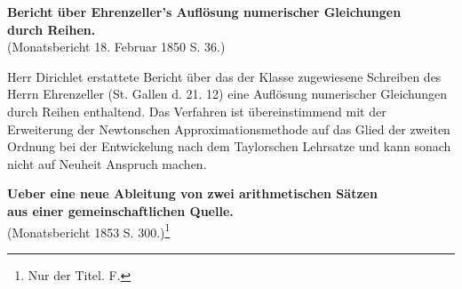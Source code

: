 \documentclass[11pt]{article}
\begin{document}
\bigskip
\begin{center}
{\large \textbf{Bericht über Ehrenzeller's Auflösung numerischer Gleichungen}}\\
{\large \textbf{durch Reihen.}}\\
{\small (Monatsbericht 18. Februar 1850 S. 36.)}
\end{center}

Herr Dirichlet erstattete Bericht über das der Klasse zugewiesene Schreiben des Herrn Ehrenzeller (St. Gallen d. 21. 12) eine Auflösung numerischer Gleichungen durch Reihen enthaltend. Das Verfahren ist übereinstimmend mit der Erweiterung der Newtonschen Approximationsmethode auf das Glied der zweiten Ordnung bei der Entwickelung nach dem Taylorschen Lehrsatze und kann sonach nicht auf Neuheit Anspruch machen.

\vspace{2em}
\begin{center}
{\large \textbf{Ueber eine neue Ableitung von zwei arithmetischen Sätzen}}\\
{\large \textbf{aus einer gemeinschaftlichen Quelle.}}\\
{\small (Monatsbericht 1853 S. 300.)\footnote{Nur der Titel. \textnormal{F.}}}
\end{center}
\end{document}
